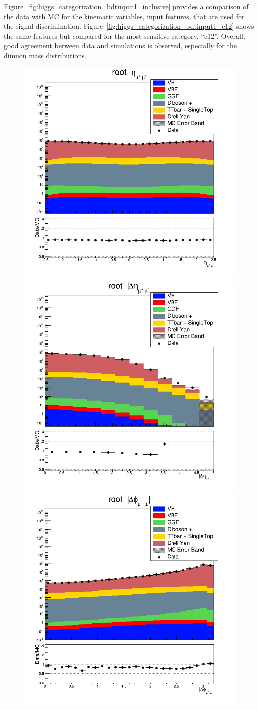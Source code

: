 Figure~\ref{fig:higgs_categorization_bdtinput1_inclusive} provides a comparison of the data with MC for the kinematic variables, input features, that are used for the signal discrimination. Figure~\ref{fig:higgs_categorization_bdtinput1_c12} shows the same features but compared for the most sensitive category, ``c12''. Overall, good agreement between data and simulations is observed, especially for the dimuon mass distributions.
\begin{figure}[htbp]
  \centering
  \includegraphics[width=0.49\linewidth]{figures/bdt_cats/dimu_eta_root.png}
  \includegraphics[width=0.49\linewidth]{figures/bdt_cats/dimu_abs_dEta_root.png}\\
  \includegraphics[width=0.49\linewidth]{figures/bdt_cats/dimu_abs_dPhi_root.png}

\end{figure}
